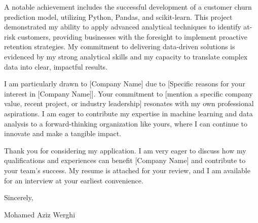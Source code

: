 \documentclass[10pt]{article}
\begin{document}
A notable achievement includes the successful development of a customer churn prediction model, utilizing Python, Pandas, and scikit-learn. This project demonstrated my ability to apply advanced analytical techniques to identify at-risk customers, providing businesses with the foresight to implement proactive retention strategies. My commitment to delivering data-driven solutions is evidenced by my strong analytical skills and my capacity to translate complex data into clear, impactful results.

\vspace{1em} %

I am particularly drawn to [Company Name] due to [Specific reasons for your interest in [Company Name]]. Your commitment to [mention a specific company value, recent project, or industry leadership] resonates with my own professional aspirations. I am eager to contribute my expertise in machine learning and data analysis to a forward-thinking organization like yours, where I can continue to innovate and make a tangible impact.

\vspace{1em} %

Thank you for considering my application. I am very eager to discuss how my qualifications and experiences can benefit [Company Name] and contribute to your team's success. My resume is attached for your review, and I am available for an interview at your earliest convenience.

\vspace{1em} %

Sincerely,

\vspace{2em} %

Mohamed Aziz Werghi
\end{document}
